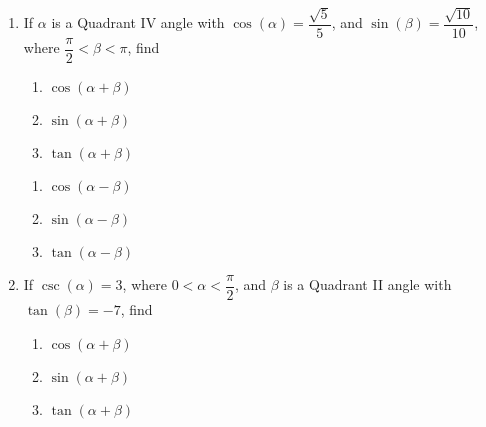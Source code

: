 \begin{enumerate}

\setcounter{enumi}{\value{HW}}

\item  If $\alpha$ is a Quadrant IV angle with $\cos(\alpha) = \dfrac{\sqrt{5}}{5}$, and  $\sin(\beta) = \dfrac{\sqrt{10}}{10}$, where $\dfrac{\pi}{2} < \beta < \pi$, find

\begin{multicols}{3}

\begin{enumerate}

\item  $\cos(\alpha + \beta)$
\item  $\sin(\alpha + \beta)$
\item  $\tan(\alpha + \beta)$

\setcounter{HWindent}{\value{enumii}}

\end{enumerate}

\end{multicols}

\begin{multicols}{3}

\begin{enumerate}

\setcounter{enumii}{\value{HWindent}}

\item  $\cos(\alpha - \beta)$
\item  $\sin(\alpha - \beta)$
\item  $\tan(\alpha - \beta)$

\end{enumerate}

\end{multicols}

\item  If $\csc(\alpha) = 3$, where $0 < \alpha < \dfrac{\pi}{2}$, and $\beta$ is a Quadrant II angle with $\tan(\beta) = -7$, find

\begin{multicols}{3}

\begin{enumerate}

\item  $\cos(\alpha + \beta)$
\item  $\sin(\alpha + \beta)$
\item  $\tan(\alpha + \beta)$

\setcounter{HWindent}{\value{enumii}}


\end{enumerate}
\end{multicols}
\end{enumerate}
